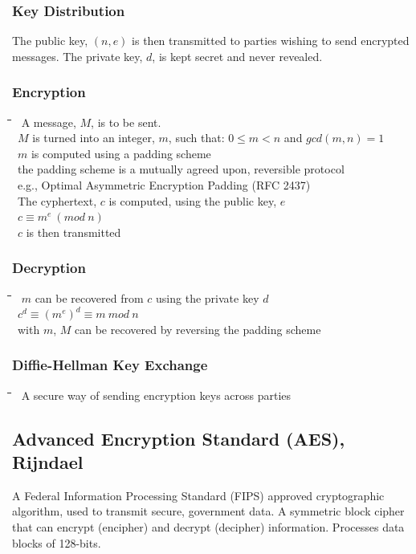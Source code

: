 \documentclass[10pt,letterpaper]{scrartcl}
\newcommand{\tbul}{\textbullet}
\newcommand{\tend}{\>\textendash}
\newcommand{\tasc}{\>\>\textasteriskcentered}
\newcommand{\tabDef}{\hspace{2em}\=\hspace{2em}\=\hspace{2em}\=\hspace{2em}\=\kill}
\begin{document}
	\subsubsection{Key Distribution}
	The public key, $(n, e)$ is then transmitted to parties wishing to send encrypted messages. The private key, $d$, is kept secret and never revealed.
	\subsubsection{Encryption}\begin{tabbing}\tabDef 
	\tbul\ A message, $M$, is to be sent. \\
	\tbul\ $M$ is turned into an integer, $m$, such that: $0 \leq m < n$ and $gcd(m, n) = 1$ \\
	\tend\ $m$ is computed using a padding scheme \\
	\tasc\ the padding scheme is a mutually agreed upon, reversible protocol\\
	\tasc\ e.g., Optimal Asymmetric Encryption Padding (RFC 2437)\\
	\tbul\ The cyphertext, $c$ is computed, using the public key, $e$ \\
	\tend\ $\displaystyle c \equiv m^e \ (mod \ n)$ \\
	\tbul\ $c$ is then transmitted\end{tabbing}
	\subsubsection{Decryption}\begin{tabbing}\tabDef 
	\tbul\ $m$ can be recovered from $c$ using the private key $d$ \\
	\tend\ $\displaystyle c^d\equiv (m^e)^d\equiv m \ mod \ n$ \\
	\tbul\ with $m$, $M$ can be recovered by reversing the padding scheme\end{tabbing}
	\subsubsection{Diffie-Hellman Key Exchange}
	\begin{tabbing}\tabDef 
		\tbul\ A secure way of sending encryption keys across parties
	\end{tabbing}
	
	\subsection{Advanced Encryption Standard (AES), Rijndael}
	A Federal Information Processing Standard (FIPS) approved cryptographic algorithm, used to transmit secure, government data. A symmetric block cipher that can encrypt (encipher) and decrypt (decipher) information. Processes data blocks of 128-bits.
\end{document}
